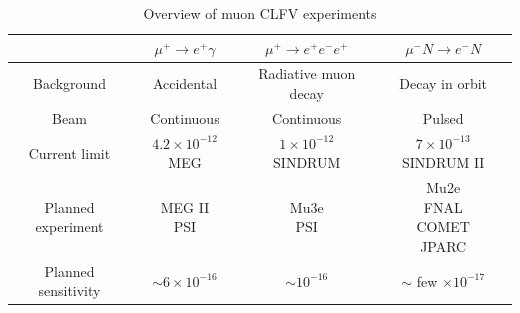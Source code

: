 \documentclass[12pt,a4paper,openright, oneside, titlepage]{book} %
\begin{document}
\begin{table}[!h]
\centering
\begin{tabular}{|c||c|c|c|}
\hline
& $\mu^+\rightarrow e^+\gamma$ & $\mu^+\rightarrow e^+e^-e^+$ & $\mu^- N \rightarrow e^- N$ \\
\hline \hline 
Background &
Accidental &
Radiative muon decay &
Decay in orbit \\
\hline
Beam &
Continuous &
Continuous &
Pulsed \\
\hline
Current limit &
\makecell{$4.2 \times 10^{-12}$ \\ MEG \cite{MEG}} &
\makecell{$1\times10^{-12}$ \\ SINDRUM \cite{SINDRUM}} & 
\makecell{$7\times10^{-13}$ \\ SINDRUM II \cite{SINDRUMII}} \\
\hline
Planned experiment &
\makecell{MEG II \\ PSI \cite{MEG_upgrade}\cite{MEG_II}\cite{Papa}}&
\makecell{Mu3e \\ PSI \cite{Mu3e:2014}\cite{Mu3e:2016}\cite{Papa}} &
\makecell{Mu2e \\ FNAL \cite{mu2e_proposal} \cite{MTDR}\\ COMET \\ JPARC\cite{COMET_2009}\cite{COMET_2012}\cite{COMET_2012_2}\cite{COMET_I}} \\
\hline
Planned sensitivity &
$\sim 6\times 10^{-16}$&
$\sim 10^{-16}$&
$\sim$ few $\times 10^{-17}$ \\
\hline
\end{tabular}
\caption[CLFV searches with muons]{Overview of muon CLFV experiments}
\label{T_CLFV_mu}
\end{table}
\end{document}
